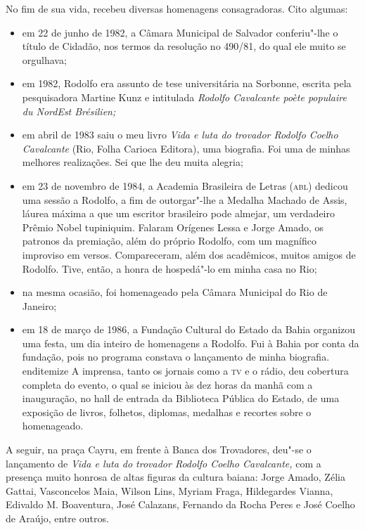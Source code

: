 No fim de sua vida, recebeu diversas homenagens consagradoras. Cito
algumas:
\begin{itemize}
\item
em 22 de junho de 1982, a Câmara Municipal de Salvador conferiu"-lhe
o título de Cidadão, nos termos da resolução no 490/81, do qual ele
muito se orgulhava;

\item
em 1982, Rodolfo era assunto de tese universitária na Sorbonne,
escrita pela pesquisadora Martine Kunz e intitulada \textit{Rodolfo
Cavalcante poète populaire du NordEst Brésilien;}

\item
em abril de 1983 saiu o meu livro \textit{Vida e luta do trovador
Rodolfo Coelho Cavalcante} (Rio, Folha Carioca Editora), uma biografia.
Foi uma de minhas melhores realizações. Sei que lhe deu muita alegria;

\item
em 23 de novembro de 1984, a Academia Brasileira de Letras (\textsc{abl})
dedicou uma sessão a Rodolfo, a fim de outorgar"-lhe a Medalha Machado
de Assis, láurea máxima a que um escritor brasileiro pode almejar, um
verdadeiro Prêmio Nobel tupiniquim. Falaram Orígenes Lessa e Jorge
Amado, os patronos da premiação, além do próprio Rodolfo, com um
magnífico improviso em versos. Compareceram, além dos acadêmicos,
muitos amigos de Rodolfo. Tive, então, a honra de hospedá"-lo em minha
casa no Rio;

\item
na mesma ocasião, foi homenageado pela Câmara Municipal do Rio de
Janeiro;

\item
em 18 de março de 1986, a Fundação Cultural do Estado da Bahia
organizou uma festa, um dia inteiro de homenagens a Rodolfo. Fui à
Bahia por conta da fundação, pois no programa constava o lançamento de
minha biografia.
end{itemize}
A imprensa, tanto os jornais como a \textsc{tv} e o rádio, deu cobertura
completa do evento, o qual se iniciou às dez horas da manhã com a
inauguração, no hall de entrada da Biblioteca Pública do Estado, de uma
exposição de livros, folhetos, diplomas, medalhas e recortes sobre o
homenageado.
\end{itemize}

A seguir, na praça Cayru, em frente à Banca dos Trovadores, deu"-se o
lançamento de \textit{Vida e luta do trovador Rodolfo Coelho
Cavalcante,} com a presença muito honrosa de altas figuras da cultura
baiana: Jorge Amado, Zélia Gattai, Vasconcelos Maia, Wilson Lins,
Myriam Fraga, Hildegardes Vianna, Edivaldo M. Boaventura, José
Calazans, Fernando da Rocha Peres e José Coelho de Araújo, entre
outros.

